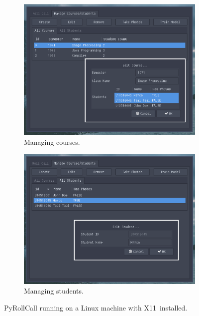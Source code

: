 \begin{figure}[!htb]
  \centering
  \begin{subfigure}[b]{0.49\linewidth}
    \includegraphics[width=\linewidth]{figures/preview1.eps}
    \caption{Managing courses.}
  \end{subfigure}
  \begin{subfigure}[b]{0.49\linewidth}
    \includegraphics[width=\linewidth]{figures/preview2.eps}
    \caption{Managing students.}
  \end{subfigure}
  \caption{PyRollCall running on a Linux machine with X11\protect\footnotemark \ installed.}
  \label{fig:systemAppearance}
\end{figure}
\vspace{0.5cm}

